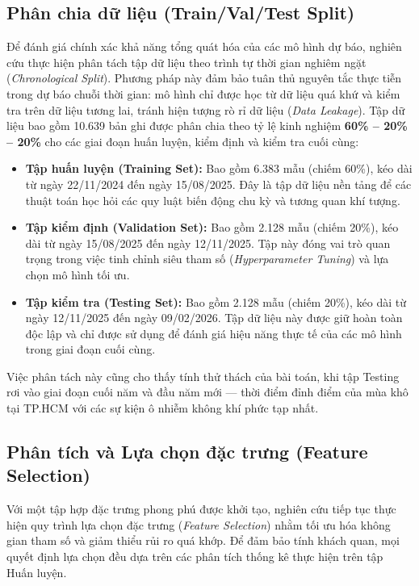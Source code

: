 \subsection{Phân chia dữ liệu (Train/Val/Test Split)}
Để đánh giá chính xác khả năng tổng quát hóa của các mô hình dự báo, nghiên cứu thực hiện phân tách tập dữ liệu theo trình tự thời gian nghiêm ngặt (\textit{Chronological Split}). Phương pháp này đảm bảo tuân thủ nguyên tắc thực tiễn trong dự báo chuỗi thời gian: mô hình chỉ được học từ dữ liệu quá khứ và kiểm tra trên dữ liệu tương lai, tránh hiện tượng rò rỉ dữ liệu (\textit{Data Leakage}).
Tập dữ liệu bao gồm 10.639 bản ghi được phân chia theo tỷ lệ kinh nghiệm \textbf{60\% -- 20\% -- 20\%} cho các giai đoạn huấn luyện, kiểm định và kiểm tra cuối cùng:
\begin{itemize}
    \item \textbf{Tập huấn luyện (Training Set):} Bao gồm 6.383 mẫu (chiếm 60\%), kéo dài từ ngày 22/11/2024 đến ngày 15/08/2025. Đây là tập dữ liệu nền tảng để các thuật toán học hỏi các quy luật biến động chu kỳ và tương quan khí tượng.
    \item \textbf{Tập kiểm định (Validation Set):} Bao gồm 2.128 mẫu (chiếm 20\%), kéo dài từ ngày 15/08/2025 đến ngày 12/11/2025. Tập này đóng vai trò quan trọng trong việc tinh chỉnh siêu tham số (\textit{Hyperparameter Tuning}) và lựa chọn mô hình tối ưu.
    \item \textbf{Tập kiểm tra (Testing Set):} Bao gồm 2.128 mẫu (chiếm 20\%), kéo dài từ ngày 12/11/2025 đến ngày 09/02/2026. Tập dữ liệu này được giữ hoàn toàn độc lập và chỉ được sử dụng để đánh giá hiệu năng thực tế của các mô hình trong giai đoạn cuối cùng.
\end{itemize}
Việc phân tách này cũng cho thấy tính thử thách của bài toán, khi tập Testing rơi vào giai đoạn cuối năm và đầu năm mới --- thời điểm đỉnh điểm của mùa khô tại TP.HCM với các sự kiện ô nhiễm không khí phức tạp nhất.

\subsection{Phân tích và Lựa chọn đặc trưng (Feature Selection)}
Với một tập hợp đặc trưng phong phú được khởi tạo, nghiên cứu tiếp tục thực hiện quy trình lựa chọn đặc trưng (\textit{Feature Selection}) nhằm tối ưu hóa không gian tham số và giảm thiểu rủi ro quá khớp. Để đảm bảo tính khách quan, mọi quyết định lựa chọn đều dựa trên các phân tích thống kê thực hiện trên tập Huấn luyện.
